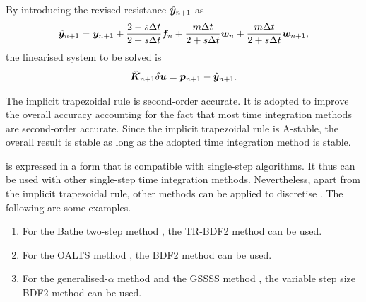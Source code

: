 By introducing the revised resistance $\hat{\bm{y}}_{n+1}$ as
\begin{gather}\label{eq:revised_y}
\hat{\bm{y}}_{n+1}=\bm{y}_{n+1}+\dfrac{2-s\Delta{}t}{2+s\Delta{}t}\bm{f}_n+\dfrac{m\Delta{}t}{2+s\Delta{}t}\bm{w}_n+\dfrac{m\Delta{}t}{2+s\Delta{}t}\bm{w}_{n+1},
\end{gather}
the linearised system to be solved is
\begin{gather}\label{eq:revised_system}
\hat{\bm{K}}_{n+1}\delta\bm{u}=\bm{p}_{n+1}-\hat{\bm{y}}_{n+1}.
\end{gather}
\begin{Objective}
The implicit trapezoidal rule is second-order accurate. It is adopted to improve the overall accuracy accounting for the fact that most time integration methods are second-order accurate. Since the implicit trapezoidal rule is A-stable, the overall result is stable as long as the adopted time integration method is stable.

 is expressed in a form that is compatible with single-step algorithms. It thus can be used with other single-step time integration methods. Nevertheless, apart from the implicit trapezoidal rule, other methods can be applied to discretise . The following are some examples.
\begin{enumerate}
\item For the Bathe two-step method \citep{Noh2019}, the TR-BDF2 method \citep{Bank1985} can be used.
\item For the OALTS method \citep{Zhang2021}, the BDF2 method can be used.
\item For the generalised-$\alpha$ method \citep{Chung1993} and the GSSSS method \citep{Zhou2003}, the variable step size BDF2 method can be used.
\end{enumerate}
\end{Objective}

